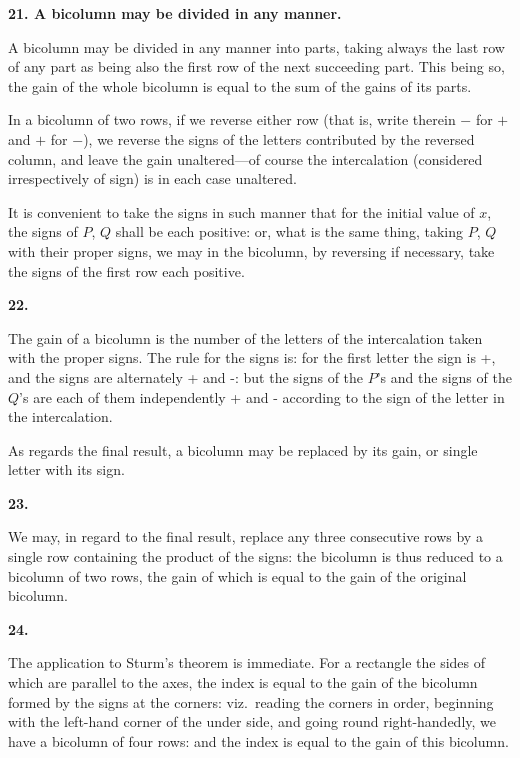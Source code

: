 \documentclass[11pt,a4paper]{book}
\begin{document}
\newpage
\setcounter{page}{29}

\textbf{21. A bicolumn may be divided in any manner.}

A bicolumn may be divided in any manner into parts, taking always the last row of any part as being also the first row of the next succeeding part. This being so, the gain of the whole bicolumn is equal to the sum of the gains of its parts.

In a bicolumn of two rows, if we reverse either row (that is, write therein $-$ for $+$ and $+$ for $-$), we reverse the signs of the letters contributed by the reversed column, and leave the gain unaltered---of course the intercalation (considered irrespectively of sign) is in each case unaltered.

It is convenient to take the signs in such manner that for the initial value of $x$, the signs of $P$, $Q$ shall be each positive: or, what is the same thing, taking $P$, $Q$ with their proper signs, we may in the bicolumn, by reversing if necessary, take the signs of the first row each positive.

\textbf{22.}

The gain of a bicolumn is the number of the letters of the intercalation taken with the proper signs. The rule for the signs is: for the first letter the sign is +, and the signs are alternately + and -: but the signs of the $P$'s and the signs of the $Q$'s are each of them independently + and - according to the sign of the letter in the intercalation.

As regards the final result, a bicolumn may be replaced by its gain, or single letter with its sign.

\textbf{23.}

We may, in regard to the final result, replace any three consecutive rows by a single row containing the product of the signs: the bicolumn is thus reduced to a bicolumn of two rows, the gain of which is equal to the gain of the original bicolumn.

\newpage
\setcounter{page}{30}

\textbf{24.}

The application to Sturm's theorem is immediate. For a rectangle the sides of which are parallel to the axes, the index is equal to the gain of the bicolumn formed by the signs at the corners: viz.\ reading the corners in order, beginning with the left-hand corner of the under side, and going round right-handedly, we have a bicolumn of four rows: and the index is equal to the gain of this bicolumn.
\end{document}
